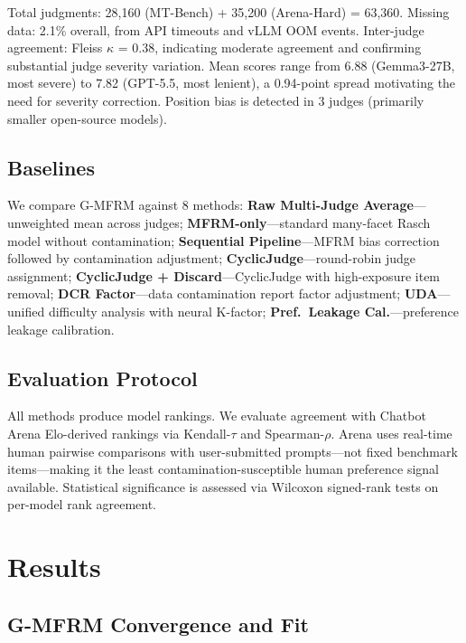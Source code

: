 \documentclass[11pt]{article}
\newcommand{\gmfrm}{G-MFRM}
\begin{document}
Total judgments: 28,160 (MT-Bench) + 35,200 (Arena-Hard) = 63,360.
Missing data: 2.1\% overall, from API timeouts and vLLM OOM events.
Inter-judge agreement: Fleiss $\kappa$ = 0.38, indicating moderate agreement and confirming substantial judge severity variation.
Mean scores range from 6.88 (Gemma3-27B, most severe) to 7.82 (GPT-5.5, most lenient), a 0.94-point spread motivating the need for severity correction.
Position bias is detected in 3 judges (primarily smaller open-source models).

\subsection{Baselines}

We compare \gmfrm{} against 8 methods:
\textbf{Raw Multi-Judge Average}---unweighted mean across judges;
\textbf{MFRM-only}---standard many-facet Rasch model without contamination;
\textbf{Sequential Pipeline}---MFRM bias correction followed by contamination adjustment;
\textbf{CyclicJudge}---round-robin judge assignment;
\textbf{CyclicJudge + Discard}---CyclicJudge with high-exposure item removal;
\textbf{DCR Factor}---data contamination report factor adjustment;
\textbf{UDA}---unified difficulty analysis with neural K-factor;
\textbf{Pref.\ Leakage Cal.}---preference leakage calibration.

\subsection{Evaluation Protocol}

All methods produce model rankings. We evaluate agreement with Chatbot Arena Elo-derived rankings via Kendall-$\tau$ and Spearman-$\rho$.
Arena uses real-time human pairwise comparisons with user-submitted prompts---not fixed benchmark items---making it the least contamination-susceptible human preference signal available.
Statistical significance is assessed via Wilcoxon signed-rank tests on per-model rank agreement.

\section{Results}
\label{sec:results}

\subsection{G-MFRM Convergence and Fit}
\end{document}
